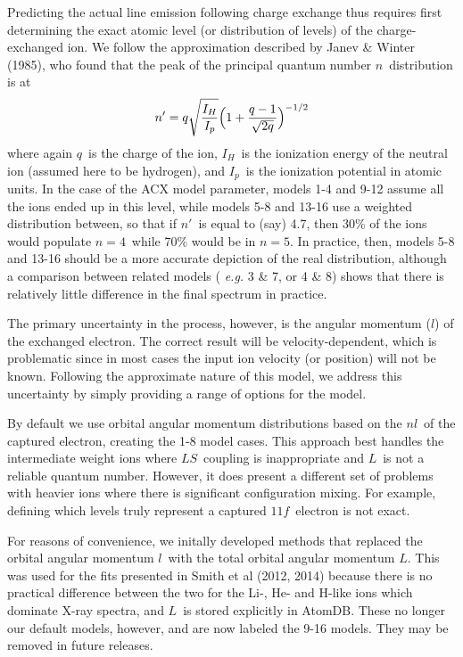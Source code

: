\documentclass[11pt]{article}
\begin{document}
Predicting the actual line emission following charge exchange thus requires
first determining the exact atomic level (or distribution of levels)
of the charge-exchanged ion.  We follow the approximation described by
Janev \& Winter (1985), who found that the peak of the principal
quantum number $n$\ distribution is at
\begin{equation}
n' = q \sqrt{{{I_H}\over{I_p}}}\Big(1 + {{q-1}\over{\sqrt{2q}}}\Big)^{-1/2}
\end{equation}
where again $q$\ is the charge of the ion, $I_H$\ is the ionization
energy of the neutral ion (assumed here to be hydrogen), and $I_p$\ is
the ionization potential in atomic units.  In the case of the ACX
model parameter, models 1-4 and 9-12 assume all the ions ended up in
this level, while models 5-8 and 13-16 use a weighted distribution
between, so that if $n'$\ is equal to (say) 4.7, then 30\% of the ions
would populate $n=4$\ while 70\% would be in $n=5$.  In practice,
then, models 5-8 and 13-16 should be a more accurate depiction of the
real distribution, although a comparison between related models ({\it
  e.g.} 3 \& 7, or 4 \& 8) shows that there is relatively little
difference in the final spectrum in practice.

The primary uncertainty in the process, however, is the angular
momentum ($l$) of the exchanged electron. The correct result
will be velocity-dependent, which is problematic since in most cases
the input ion velocity (or position) will not be known. Following the
approximate nature of this model, we address this uncertainty by
simply providing a range of options for the model.  

By default we use orbital angular momentum distributions based on the
$nl$\ of the captured electron, creating the 1-8 model cases.  This approach
best handles the intermediate weight ions where $LS$\ coupling is
inappropriate and $L$\ is not a reliable quantum number.  However, it
does present a different set of problems with heavier ions where there
is significant configuration mixing. For example, defining which
levels truly represent a captured $11f$\ electron is not exact.

For reasons of convenience, we initally developed methods that
replaced the orbital angular momentum $l$\ with the total orbital
angular momentum $L$. This was used for the fits presented in Smith et
al (2012, 2014) because there is no practical difference between the
two for the Li-, He- and H-like ions which dominate X-ray spectra, and
$L$\ is stored explicitly in AtomDB.  These no longer our default
models, however, and are now labeled the 9-16 models.  They may be
removed in future releases.
\end{document}
